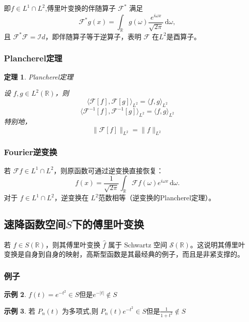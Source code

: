 \documentclass[12pt,a4paper]{article}
\theoremstyle{plain}
\newtheorem{theorem}{定理}[section]
\theoremstyle{definition}
\newtheorem{example}[theorem]{示例}
\theoremstyle{remark}
\begin{document}
即\( f \in L^1 \cap L^2 \),傅里叶变换的伴随算子 \( \mathcal{F}^* \) 满足
\[
\mathcal{F}^* g(x) = \int_{\mathbb{R}} g(\omega) \frac{e^{i\omega x}}{\sqrt{2\pi}} \, \mathrm{d}\omega,
\]
且 \( \mathcal{F}^* \mathcal{F} = \mathcal{I}d \)，即伴随算子等于逆算子，表明 \( \mathcal{F} \) 在$L^2$是酉算子。

\subsubsection{Plancherel定理}
\begin{theorem}Plancherel定理
	
	设 \( f, g \in L^2(\mathbb{R}) \)，则
	\[
	\langle \mathcal{F}[f], \mathcal{F}[g] \rangle_{L^2} = \langle f, g \rangle_{L^2}
	\]
	\[
	\langle \mathcal{F}^{-1}[f], \mathcal{F}^{-1}[g] \rangle_{L^2} = \langle f, g \rangle_{L^2}
	\]
特别地，
\[
\| \mathcal{F}[f] \|_{L^2} = \| f \|_{L^2}
\]
\end{theorem}



\subsubsection{Fourier逆变换}
若 \( \mathcal{F}f \in L^1 \cap L^2 \)，则原函数可通过逆变换直接恢复：
\[
f(x) = \frac{1}{\sqrt{2\pi}} \int_{\mathbb{R}} \mathcal{F}f(\omega) e^{i\omega x} \, \mathrm{d}\omega.
\]
对于 \( f \in L^1 \cap L^2 \)，逆变换在 \( L^2 \)范数相等（逆变换的Plancherel定理）。







\subsection{速降函数空间$S$下的傅里叶变换}
若 $f \in S(\mathbb{R})$，则其傅里叶变换 $\hat{f}$ 属于 Schwartz 空间 $\mathcal{S}(\mathbb{R})$。这说明其傅里叶变换是自身到自身的映射，高斯型函数是其最经典的例子，而且是非紧支撑的。

\subsubsection{例子}
\begin{example}
\(f(t)=e^{-t^{2}} \in S \)但是\(e^{-|t|} \notin S\)
\end{example}

\begin{example}
若 \(P_{n}(t)\) 为多项式,则 \(P_{n}(t)e^{-t^{2}} \in S\)但是\(\frac{1}{1 + t^{2}} \notin S\)
\end{example}
\end{document}
